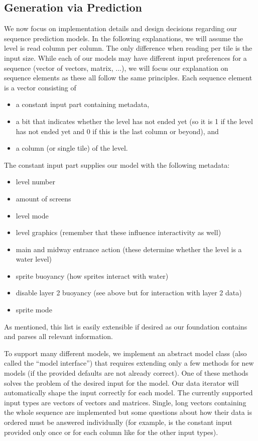 \subsection{Generation via Prediction}
\label{sec:generation-via-prediction}

We now focus on implementation details and design decisions regarding
our sequence prediction models. In the following explanations, we will
assume the level is read column per column. The only difference when
reading per tile is the input size. While each of our models may have
different input preferences for a sequence (vector of vectors, matrix,
...), we will focus our explanation on sequence elements as these all
follow the same principles. Each sequence element is a vector
consisting of
\begin{itemize}
\item a constant input part containing metadata,
\item a bit that indicates whether the level has not ended yet (so it
  is 1 if the level has not ended yet and 0 if this is the last column
  or beyond), and
\item a column (or single tile) of the level.
\end{itemize}
The constant input part supplies our model with the following
metadata:
\begin{itemize}
\item level number
\item amount of screens
\item level mode
\item level graphics (remember that these influence interactivity as well)
\item main and midway entrance action (these determine whether the
  level is a water level)
\item sprite buoyancy (how sprites interact with water)
\item disable layer 2 buoyancy (see above but for interaction with layer 2 data)
\item sprite mode
\end{itemize}
As mentioned, this list is easily extensible if desired as our
foundation contains and parses all relevant information.

To support many different models, we implement an abstract model class
(also called the ``model interface'') that requires extending only a
few methods for new models (if the provided defaults are not already
correct). One of these methods solves the problem of the desired input
for the model. Our data iterator will automatically shape the input
correctly for each model. The currently supported input types are
vectors of vectors and matrices. Single, long vectors containing the
whole sequence are implemented but some questions about how their data
is ordered must be answered individually (for example, is the constant
input provided only once or for each column like for the other input
types).

